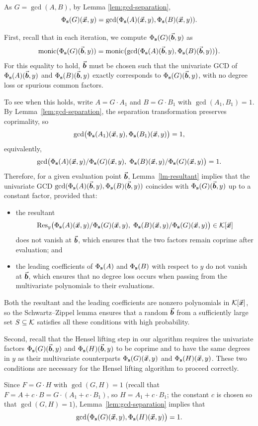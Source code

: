 \documentclass{article}
\numberwithin{equation}{section}
\begin{document}
As $G=\gcd(A,B)$, by Lemma \ref{lem:gcd-separation}, 
\[
\Phi_{\mathbf{s}}(G)(\vec{\boldsymbol{x}}, y) = \gcd( \Phi_{\mathbf{s}}(A)(\vec{\boldsymbol{x}}, y), \Phi_{\mathbf{s}}(B)(\vec{\boldsymbol{x}}, y) ).
\]

First, recall that in each iteration, we compute $\Phi_{\mathbf{s}}(G)(\vec{\boldsymbol{b}}, y)$ as
\[
\operatorname{monic}(\Phi_{\mathbf{s}}(G)(\vec{\boldsymbol{b}}, y) )= \operatorname{monic}\bigl( \gcd( \Phi_{\mathbf{s}}(A)(\vec{\boldsymbol{b}}, y), \Phi_{\mathbf{s}}(B)(\vec{\boldsymbol{b}}, y) ) \bigr).
\]
For this equality to hold, $\vec{\boldsymbol{b}}$ must be chosen such that the univariate GCD of $\Phi_{\mathbf{s}}(A)(\vec{\boldsymbol{b}}, y)$ and $\Phi_{\mathbf{s}}(B)(\vec{\boldsymbol{b}}, y)$ exactly corresponds to $\Phi_{\mathbf{s}}(G)(\vec{\boldsymbol{b}}, y)$, with no degree loss or spurious common factors. 

To see when this holds, write $A = G \cdot A_1$ and $B = G \cdot B_1$ with $\gcd(A_1, B_1) = 1$. By Lemma~\ref{lem:gcd-separation}, the separation transformation preserves coprimality, so
\[
\gcd\bigl( \Phi_{\mathbf{s}}(A_1)(\vec{\boldsymbol{x}}, y), \Phi_{\mathbf{s}}(B_1)(\vec{\boldsymbol{x}}, y) \bigr) = 1,
\]
equivalently,
\[
\gcd\bigl( \Phi_{\mathbf{s}}(A)(\vec{\boldsymbol{x}}, y)/\Phi_{\mathbf{s}}(G)(\vec{\boldsymbol{x}}, y),\; \Phi_{\mathbf{s}}(B)(\vec{\boldsymbol{x}}, y)/\Phi_{\mathbf{s}}(G)(\vec{\boldsymbol{x}}, y) \bigr) = 1.
\]
Therefore, for a given evaluation point $\vec{\boldsymbol{b}}$, Lemma~\ref{lm-resultant} implies that the univariate GCD $\gcd(\Phi_{\mathbf{s}}(A)(\vec{\boldsymbol{b}}, y), \Phi_{\mathbf{s}}(B)(\vec{\boldsymbol{b}}, y))$ coincides with $\Phi_{\mathbf{s}}(G)(\vec{\boldsymbol{b}}, y)$ up to a constant factor, provided that:
\begin{itemize}
    \item the resultant
    \[
    \operatorname{Res}_y\bigl( \Phi_{\mathbf{s}}(A)(\vec{\boldsymbol{x}}, y)/\Phi_{\mathbf{s}}(G)(\vec{\boldsymbol{x}}, y),\; \Phi_{\mathbf{s}}(B)(\vec{\boldsymbol{x}}, y)/\Phi_{\mathbf{s}}(G)(\vec{\boldsymbol{x}}, y) \bigr) \in {\mathcal{K}}[\vec{\boldsymbol{x}}]
    \]
    does not vanish at $\vec{\boldsymbol{b}}$, which ensures that the two factors remain coprime after evaluation; and
    \item the leading coefficients of $\Phi_{\mathbf{s}}(A)$ and $\Phi_{\mathbf{s}}(B)$ with respect to $y$ do not vanish at $\vec{\boldsymbol{b}}$, which ensures that no degree loss occurs when passing from the multivariate polynomials to their evaluations.
\end{itemize}
Both the resultant and the leading coefficients are nonzero polynomials in ${\mathcal{K}}[\vec{\boldsymbol{x}}]$, so the Schwartz--Zippel lemma ensures that a random $\vec{\boldsymbol{b}}$ from a sufficiently large set $S \subseteq {\mathcal{K}}$ satisfies all these conditions with high probability. 


Second, recall that the Hensel lifting step in our algorithm requires the univariate factors $\Phi_{\mathbf{s}}(G)(\vec{\boldsymbol{b}}, y)$ and $\Phi_{\mathbf{s}}(H)(\vec{\boldsymbol{b}}, y)$ to be coprime and to have the same degrees in $y$ as their multivariate counterparts $\Phi_{\mathbf{s}}(G)(\vec{\boldsymbol{x}}, y)$ and $\Phi_{\mathbf{s}}(H)(\vec{\boldsymbol{x}}, y)$. These two conditions are necessary for the Hensel lifting algorithm to proceed correctly.

Since $F = G \cdot H$ with $\gcd(G, H) = 1$ (recall that $F = A + c \cdot B = G \cdot (A_1 + c \cdot B_1)$, so $H = A_1 + c \cdot B_1$; the constant $c$ is chosen so that $\gcd(G, H) = 1$), Lemma~\ref{lem:gcd-separation} implies that
\[
\gcd\bigl( \Phi_{\mathbf{s}}(G)(\vec{\boldsymbol{x}}, y), \Phi_{\mathbf{s}}(H)(\vec{\boldsymbol{x}}, y) \bigr) = 1.
\]
\end{document}
